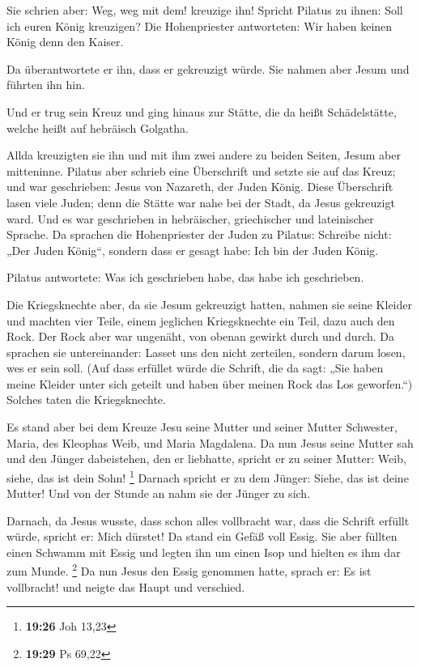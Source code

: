  Sie schrien aber: Weg, weg mit dem! kreuzige ihn! Spricht
Pilatus zu ihnen: Soll ich euren König kreuzigen? Die Hohenpriester
antworteten: Wir haben keinen König denn den Kaiser.

 Da überantwortete er ihn, dass er gekreuzigt würde. Sie
nahmen aber Jesum und führten ihn hin.

 Und er trug sein Kreuz und ging hinaus zur Stätte, die da
heißt Schädelstätte, welche heißt auf hebräisch Golgatha.

 Allda kreuzigten sie ihn und mit ihm zwei andere zu beiden
Seiten, Jesum aber mitteninne.  Pilatus aber schrieb eine
Überschrift und setzte sie auf das Kreuz; und war geschrieben: Jesus von
Nazareth, der Juden König.  Diese Überschrift lasen viele
Juden; denn die Stätte war nahe bei der Stadt, da Jesus gekreuzigt ward.
Und es war geschrieben in hebräischer, griechischer und lateinischer
Sprache.  Da sprachen die Hohenpriester der Juden zu
Pilatus: Schreibe nicht: „Der Juden König``, sondern dass er gesagt
habe: Ich bin der Juden König.

 Pilatus antwortete: Was ich geschrieben habe, das habe ich
geschrieben.

 Die Kriegsknechte aber, da sie Jesum gekreuzigt hatten,
nahmen sie seine Kleider und machten vier Teile, einem jeglichen
Kriegsknechte ein Teil, dazu auch den Rock. Der Rock aber war ungenäht,
von obenan gewirkt durch und durch.  Da sprachen sie
untereinander: Lasset uns den nicht zerteilen, sondern darum losen, wes
er sein soll. (Auf dass erfüllet würde die Schrift, die da sagt: „Sie
haben meine Kleider unter sich geteilt und haben über meinen Rock das
Los geworfen.``) Solches taten die Kriegsknechte.

 Es stand aber bei dem Kreuze Jesu seine Mutter und seiner
Mutter Schwester, Maria, des Kleophas Weib, und Maria Magdalena.
 Da nun Jesus seine Mutter sah und den Jünger dabeistehen,
den er liebhatte, spricht er zu seiner Mutter: Weib, siehe, das ist dein
Sohn! \footnote{\textbf{19:26} Joh 13,23}  Darnach spricht
er zu dem Jünger: Siehe, das ist deine Mutter! Und von der Stunde an
nahm sie der Jünger zu sich.

 Darnach, da Jesus wusste, dass schon alles vollbracht war,
dass die Schrift erfüllt würde, spricht er: Mich dürstet! 
Da stand ein Gefäß voll Essig. Sie aber füllten einen Schwamm mit Essig
und legten ihn um einen Isop und hielten es ihm dar zum Munde.
\footnote{\textbf{19:29} Ps 69,22}  Da nun Jesus den Essig
genommen hatte, sprach er: Es ist vollbracht! und neigte das Haupt und
verschied.

